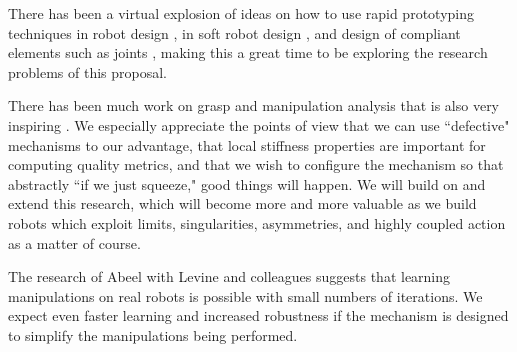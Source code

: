 There has been a virtual explosion of ideas on how to use rapid prototyping techniques in robot design \cite{dollar2010highly}, in soft robot design \cite{hirose1978development,deimel2015novel,rus2015design,wehner2014pneumatic,polygerinos2015modeling}, and design of compliant elements such as joints \cite{kuo2016novel}, making this a great time to be exploring the research problems of this proposal.

There has been much work on grasp and manipulation analysis that is also very inspiring \cite{trinkle1990planning,prattichizzo2013motion,prattichizzo1997consistent,lin2000stiffness}.  We especially appreciate the points of view that we can use ``defective" mechanisms to our advantage, that local stiffness properties are important for computing quality metrics, and that we wish to configure the mechanism so that abstractly ``if we just squeeze," good things will happen. We will build on and extend this research, which will become more and more valuable as we build robots which exploit limits, singularities, asymmetries, and highly coupled action as a matter of course.

The research of Abeel with Levine and colleagues \cite{finn2015deep,kumaroptimal,levine2015learning} suggests that learning manipulations on real robots is possible with small numbers of iterations.   We expect even faster learning and increased robustness if the mechanism is designed to simplify the manipulations being performed.